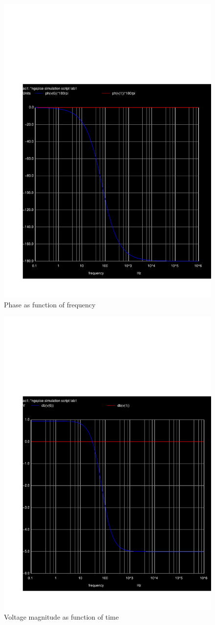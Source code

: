 \begin{figure}[h] \centering
\includegraphics[width=0.6\linewidth]{teste_5_p.pdf}
\caption{Phase as function of frequency}
\label{fig:Ph(v(1))*180/pi Ph(v(6))*180/pi}
\end{figure}

\begin{figure}[h] \centering
\includegraphics[width=0.6\linewidth]{teste_5_db.pdf}
\caption{Voltage magnitude as function of time}
\label{fig:db(v(1)) db(v(6))}
\end{figure}

